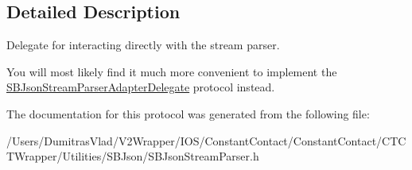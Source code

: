\subsection{Detailed Description}
Delegate for interacting directly with the stream parser. 

You will most likely find it much more convenient to implement the \hyperlink{protocol_s_b_json_stream_parser_adapter_delegate-p}{S\-B\-Json\-Stream\-Parser\-Adapter\-Delegate} protocol instead. 

The documentation for this protocol was generated from the following file\-:\begin{DoxyCompactItemize}
\item 
/\-Users/\-Dumitras\-Vlad/\-V2\-Wrapper/\-I\-O\-S/\-Constant\-Contact/\-Constant\-Contact/\-C\-T\-C\-T\-Wrapper/\-Utilities/\-S\-B\-Json/S\-B\-Json\-Stream\-Parser.\-h\end{DoxyCompactItemize}

